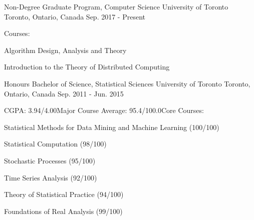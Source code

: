 
\begin{cventries}

  \cventry
    {Non-Degree Graduate Program, Computer Science} %
    {University of Toronto} %
    {Toronto, Ontario, Canada} %
    {Sep. 2017 - Present} %
    {Courses: \newline \hphantom{0}
      \begin{cvitems}
        \item {Algorithm Design, Analysis and Theory}
        \item {Introduction to the Theory of Distributed Computing}
      \end{cvitems}
    }
\end{cventries}
\begin{cventries}
  \cventry
    {Honours Bachelor of Science, Statistical Sciences} %
    {University of Toronto} %
    {Toronto, Ontario, Canada} %
    {Sep. 2011 - Jun. 2015} %
    {CGPA: 3.94/4.00\newline Major Course Average: 95.4/100.0\newline Core Courses: \newline \hphantom{0}
      \begin{cvitems}
        \item {Statistical Methods for Data Mining and Machine Learning (100/100)}
        \item {Statistical Computation (98/100)}
        \item {Stochastic Processes (95/100)}
        \item {Time Series Analysis (92/100)}
        \item {Theory of Statistical Practice (94/100)}
        \item {Foundations of Real Analysis (99/100)}
      \end{cvitems}
    }
\end{cventries}
